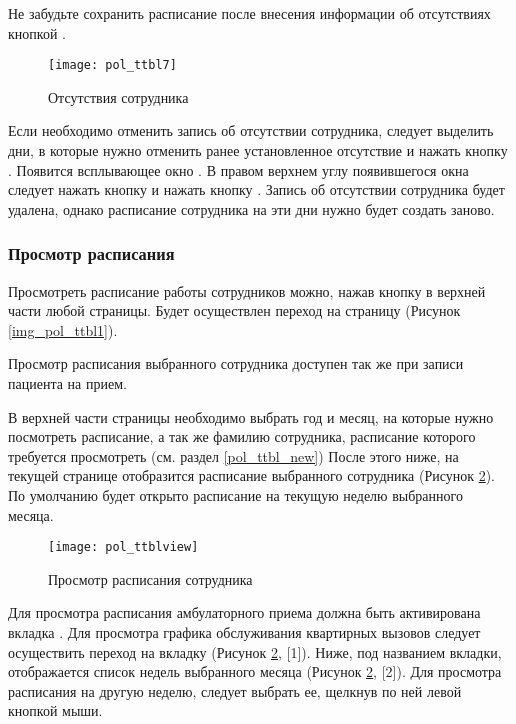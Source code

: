 \begin{vnim}
 Не забудьте сохранить расписание после внесения информации об отсутствиях кнопкой .
\end{vnim} 

\begin{figure}[ht]\centering
 \texttt{[image: pol\_ttbl7]}
 \caption{Отсутствия сотрудника}
 \label{img_pol_ttbl7}
\end{figure}

Если необходимо отменить запись об отсутствии сотрудника, следует выделить дни, в которые нужно отменить ранее установленное отсутствие и нажать кнопку . Появится всплывающее окно . В правом верхнем углу появившегося окна следует нажать кнопку  и нажать кнопку . Запись об отсутствии сотрудника будет удалена, однако расписание сотрудника на эти дни нужно будет создать заново.

\subsubsection{Просмотр расписания} \label{pol_ttbl_view}

Просмотреть расписание работы сотрудников можно, нажав кнопку  в верхней части любой страницы. Будет осуществлен переход на страницу  (Рисунок \ref{img_pol_ttbl1}).

\begin{prim}
 Просмотр расписания выбранного сотрудника доступен так же при записи пациента на прием.
\end{prim}

В верхней части страницы необходимо выбрать год и месяц, на которые нужно посмотреть расписание, а так же фамилию сотрудника, расписание которого требуется просмотреть (см. раздел \ref{pol_ttbl_new}) После этого ниже, на текущей  странице отобразится расписание выбранного сотрудника (Рисунок \ref{img_pol_ttblview}). По умолчанию будет открыто расписание на текущую неделю выбранного месяца. 

\begin{figure}[ht]\centering
 \texttt{[image: pol\_ttblview]}
 \caption{Просмотр расписания сотрудника}
 \label{img_pol_ttblview}
\end{figure}

Для просмотра расписания амбулаторного приема должна быть активирована вкладка . Для просмотра графика обслуживания квартирных вызовов следует осуществить переход на вкладку  (Рисунок \ref{img_pol_ttblview}, [1]). Ниже, под названием вкладки, отображается список недель выбранного месяца (Рисунок \ref{img_pol_ttblview}, [2]). Для просмотра расписания на другую неделю, следует выбрать ее, щелкнув по ней левой кнопкой мыши.

